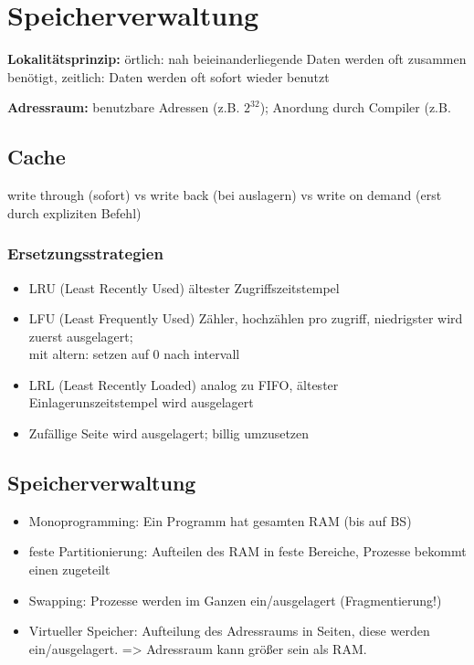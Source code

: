 \section*{Speicherverwaltung}
\textbf{Lokalitätsprinzip:} örtlich: nah beieinanderliegende Daten werden oft zusammen benötigt, zeitlich: Daten werden oft sofort wieder benutzt

\textbf{Adressraum:} benutzbare Adressen (z.B. $2^{32}$); Anordung durch Compiler (z.B.  

\subsection*{Cache}
write through (sofort) vs write back (bei auslagern) vs write on demand (erst durch expliziten Befehl)

\subsubsection*{Ersetzungsstrategien}
\begin{itemize}
\item LRU (Least Recently Used) ältester Zugriffszeitstempel
\item LFU (Least Frequently Used) Zähler, hochzählen pro zugriff, niedrigster wird zuerst ausgelagert;\\
mit altern: setzen auf 0 nach intervall
\item LRL (Least Recently Loaded) analog zu FIFO, ältester Einlagerunszeitstempel wird ausgelagert
\item Zufällige Seite wird ausgelagert; billig umzusetzen
\end{itemize}


\subsection*{Speicherverwaltung}
\begin{itemize}
\item Monoprogramming: Ein Programm hat gesamten RAM (bis auf BS)
\item feste Partitionierung: Aufteilen des RAM in feste Bereiche, Prozesse bekommt einen zugeteilt
\item Swapping: Prozesse werden im Ganzen ein/ausgelagert (Fragmentierung!)
\item Virtueller Speicher: Aufteilung des Adressraums in Seiten, diese werden ein/ausgelagert. => Adressraum kann größer sein als RAM.
\end{itemize}

